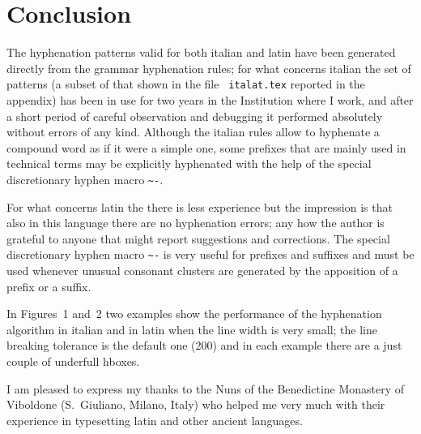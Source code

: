 \section{Conclusion}
The  hyphenation  patterns  valid  for  both  italian  and  latin  have been
generated directly from the grammar hyphenation  rules;  for  what  concerns
italian  the  set  of  patterns  (a  subset  of  that shown in the file {\tt
italat.tex} reported in the appendix) has been in use for two years  in  the
Institution  where  I  work, and after a short period of careful observation
and debugging it performed absolutely without errors of any  kind.  Although
the  italian rules allow to hyphenate a compound word as if it were a simple
one, some prefixes that are mainly used in technical terms may be explicitly
hyphenated   with  the  help  of  the  special  discretionary  hyphen  macro
\verb|~-|.

For  what  concerns latin the there is less experience but the impression is
that also in this language there are no  hyphenation  errors;  any  how  the
author  is grateful to anyone that might report suggestions and corrections.
The special discretionary hyphen macro \verb|~-| is very useful for prefixes
and  suffixes  and  must  be  used  whenever  unusual consonant clusters are
generated by the apposition of a prefix or a suffix.


In  Figures~1  and~2  two  examples  show the performance of the hyphenation
algorithm in italian and in latin when the line width  is  very  small;  the
line  breaking  tolerance is the default one (200) and in each example there
are a just couple of underfull hboxes.

I  am  pleased to express my thanks to the Nuns of the Benedictine Monastery
of Viboldone (S.~Giuliano, Milano, Italy) who helped me very much with their
experience in typesetting latin and other ancient languages.




\appendix
\onecolumn
